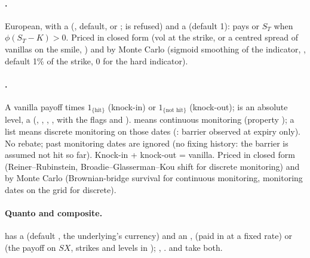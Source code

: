 \paragraph{.} European, with a  (, default, or
;  is refused) and a  (default 1): pays
 or $S_T$ when $\phi(S_T - K) > 0$. Priced in closed form (vol at the strike, or a centred spread
of vanillas on the smile, ) and by Monte Carlo (sigmoid smoothing of the indicator,
, default 1\% of the strike, 0 for the hard indicator). 

\paragraph{.} A vanilla payoff times $1_{\{\text{hit}\}}$ (knock-in) or $1_{\{\text{not hit}\}}$
(knock-out);  is an absolute level,  a  (,
, , , with the flags  and ). 
 means continuous monitoring (property ); a list means discrete monitoring on those dates
(: barrier observed at expiry only). No rebate; past monitoring dates are ignored (no fixing
history: the barrier is assumed not hit so far). Knock-in + knock-out = vanilla. Priced in closed form
(Reiner--Rubinstein, Broadie--Glasserman--Kou shift for discrete monitoring) and by Monte Carlo (Brownian-bridge
survival for continuous monitoring, monitoring dates on the grid for discrete).

\paragraph{Quanto and composite.}  has a  (default , the underlying's
currency) and an ,  (paid in  at a fixed rate) or 
(the payoff on $S X$, strikes and levels in ); , .
 and  take both.

